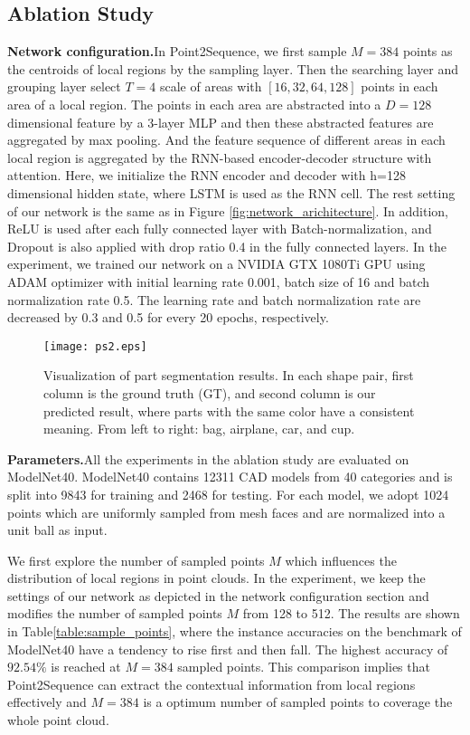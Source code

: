 \documentclass[letterpaper]{article}
\begin{document}
\subsection{Ablation Study}
\noindent
\textbf{Network configuration.}\quad In Point2Sequence, we first sample $M = 384$ points as the centroids of local regions by the sampling layer.
Then the searching layer and grouping layer select $T=4$ scale of areas with $[16, 32, 64, 128]$ points in each area of a local region.
The points in each area are abstracted into a $D=128$ dimensional feature by a 3-layer MLP and then these abstracted features are aggregated by max pooling.
And the feature sequence of different areas in each local region is aggregated by the RNN-based encoder-decoder structure with attention.
Here, we initialize the RNN encoder and decoder with h=128 dimensional hidden state, where LSTM is used as the RNN cell.
The rest setting of  our network is the same as in Figure \ref{fig:network_arichitecture}.
In addition, ReLU is used after each fully connected layer with Batch-normalization, and Dropout is also applied with drop ratio 0.4 in the fully connected layers. 
In the experiment, we trained our network on a NVIDIA GTX 1080Ti GPU using ADAM optimizer with initial learning rate 0.001, batch size of 16 and batch normalization rate 0.5.
The learning rate and batch normalization rate are decreased by 0.3 and 0.5 for every 20 epochs, respectively.
\begin{figure*}[htp]
\centering 
\texttt{[image: ps2.eps]}
\caption{Visualization of part segmentation results. In each shape pair, first column is the ground truth (GT), and second column is our predicted result, where parts with the same color have a consistent meaning. From left to right: bag, airplane, car, and cup.} \label{fig:part_segmentation}  \end{figure*}

\noindent
\newline
\textbf{Parameters.}\quad All the experiments in the ablation study are evaluated on ModelNet40. ModelNet40 contains 12311 CAD models from 40 categories and is split into 9843 for training and 2468 for testing.
For each model, we adopt 1024 points which are uniformly sampled from mesh faces and are normalized into a unit ball as input.

We first explore the number of sampled points $M$ which influences the distribution of local regions in point clouds. 
In the experiment, we keep the settings of our network as depicted in the network configuration section and modifies the number of sampled points $M$ from 128 to 512.
The results are shown in Table\ref{table:sample_points}, where the instance accuracies on the benchmark of ModelNet40 have a tendency to rise first and then fall. 
The highest accuracy of $92.54\%$ is reached at $M=384$ sampled points.
This comparison implies that Point2Sequence can extract the contextual information from local regions effectively and $M=384$ is a optimum number of sampled points to coverage the whole point cloud.
\end{document}
